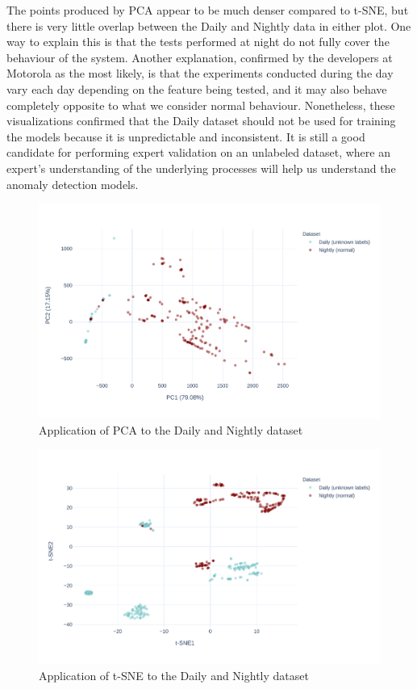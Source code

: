 The points produced by PCA appear to be much denser compared to t-SNE, but there is very little overlap between the Daily and Nightly data in either plot. One way to explain this is that the tests performed at night do not fully cover the behaviour of the system. Another explanation, confirmed by the developers at Motorola as the most likely, is that the experiments conducted during the day vary each day depending on the feature being tested, and it may also behave completely opposite to what we consider normal behaviour. Nonetheless, these visualizations confirmed that the Daily dataset should not be used for training the models because it is unpredictable and inconsistent. It is still a good candidate for performing expert validation on an unlabeled dataset, where an expert's understanding of the underlying processes will help us understand the anomaly detection models.

\begin{figure}[h]
    \centering
    \includegraphics[width=\textwidth]{img/pca-nightly-daily.pdf}
    \caption{Application of PCA to the Daily and Nightly dataset}
    \label{fig:pca-nightly-daily}
\end{figure}

\begin{figure}[h]
    \centering
    \includegraphics[width=\textwidth]{img/tsne-nightly-daily.pdf}
    \caption{Application of t-SNE to the Daily and Nightly dataset}
    \label{fig:tsne-nightly-daily}
\end{figure}


